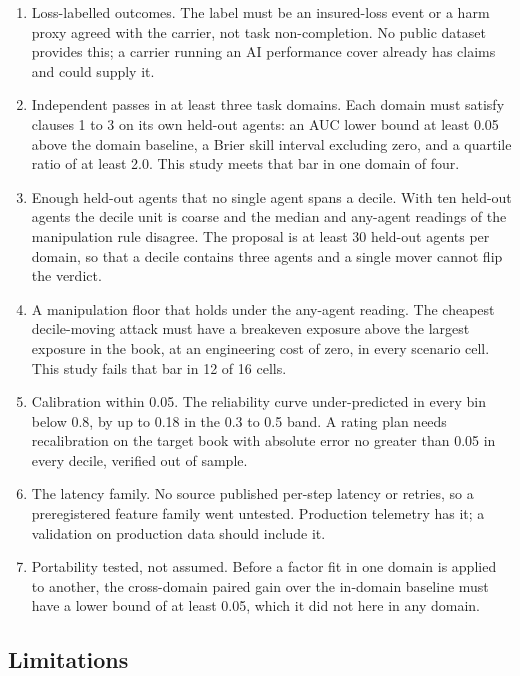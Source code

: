\documentclass[
  11pt,
  a4paper,
]{article}
\providecommand{\tightlist}{%
  \setlength{\itemsep}{0pt}\setlength{\parskip}{0pt}}
\begin{document}
\begin{enumerate}
\def\labelenumi{\arabic{enumi}.}
\tightlist
\item
  Loss-labelled outcomes. The label must be an insured-loss event or a
  harm proxy agreed with the carrier, not task non-completion. No public
  dataset provides this; a carrier running an AI performance cover
  already has claims and could supply it.
\item
  Independent passes in at least three task domains. Each domain must
  satisfy clauses 1 to 3 on its own held-out agents: an AUC lower bound
  at least 0.05 above the domain baseline, a Brier skill interval
  excluding zero, and a quartile ratio of at least 2.0. This study meets
  that bar in one domain of four.
\item
  Enough held-out agents that no single agent spans a decile. With ten
  held-out agents the decile unit is coarse and the median and any-agent
  readings of the manipulation rule disagree. The proposal is at least
  30 held-out agents per domain, so that a decile contains three agents
  and a single mover cannot flip the verdict.
\item
  A manipulation floor that holds under the any-agent reading. The
  cheapest decile-moving attack must have a breakeven exposure above the
  largest exposure in the book, at an engineering cost of zero, in every
  scenario cell. This study fails that bar in 12 of 16 cells.
\item
  Calibration within 0.05. The reliability curve under-predicted in
  every bin below 0.8, by up to 0.18 in the 0.3 to 0.5 band. A rating
  plan needs recalibration on the target book with absolute error no
  greater than 0.05 in every decile, verified out of sample.
\item
  The latency family. No source published per-step latency or retries,
  so a preregistered feature family went untested. Production telemetry
  has it; a validation on production data should include it.
\item
  Portability tested, not assumed. Before a factor fit in one domain is
  applied to another, the cross-domain paired gain over the in-domain
  baseline must have a lower bound of at least 0.05, which it did not
  here in any domain.
\end{enumerate}

\hypertarget{limitations}{%
\subsection{Limitations}\label{limitations}}
\end{document}

